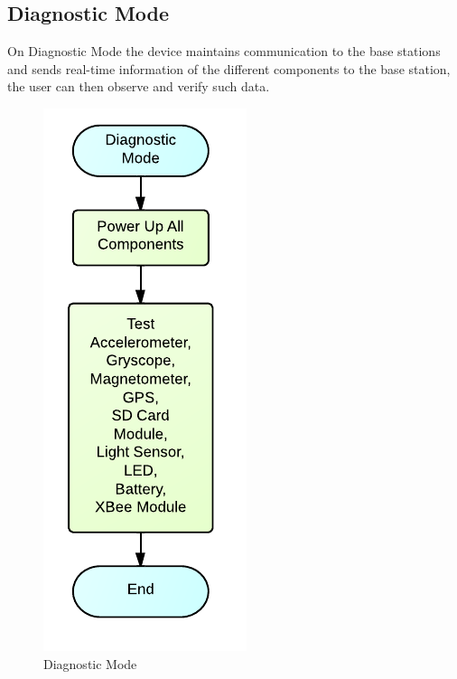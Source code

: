 \subsection{Diagnostic Mode}
On Diagnostic Mode the device maintains communication to the base stations and sends real-time information of the different components to the base station, the user can then observe and verify such data.
\begin{figure}[H]
	\centering
	\includegraphics[scale=1.0]{img/DiagnosticMode}
	\caption{Diagnostic Mode \label{fig:diagnosticMode}}
\end{figure}

